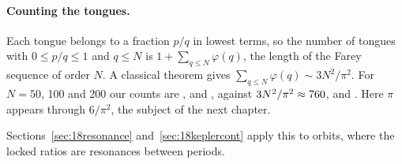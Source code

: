 \paragraph{Counting the tongues.} Each tongue belongs to a fraction $p/q$ in lowest terms, so the number of tongues with $0 \le p/q \le 1$ and $q \le N$ is $1 + \sum_{q \le N}\varphi(q)$, the length of the Farey sequence of order $N$. A classical theorem \citep[Thm.~330]{HardyWright2008} gives $\sum_{q\le N}\varphi(q) \sim 3N^2/\pi^2$. For $N = 50$, 100 and 200 our counts are \FareyFifty, \FareyHundred{} and \FareyTwoHundred, against $3N^2/\pi^2 \approx 760$, \FareyExpHundred{} and \FareyExpTwoHundred. Here $\pi$ appears through $6/\pi^2$, the subject of the next chapter.

Sections~\ref{sec:18resonance} and~\ref{sec:18keplercont} apply this to orbits, where the locked ratios are resonances between periods. \addedon{\revD}

